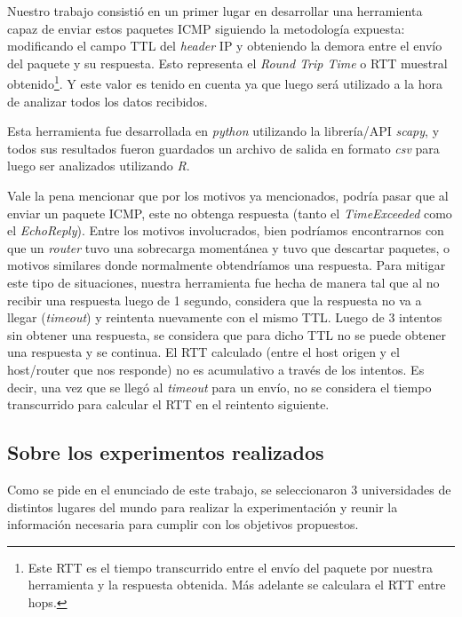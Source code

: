 \par Nuestro trabajo consisti\'o en un primer lugar en desarrollar una
herramienta capaz de enviar estos paquetes ICMP siguiendo la metodolog\'ia
expuesta: modificando el campo TTL del \textit{header} IP y obteniendo la demora
entre el env\'io del paquete y su respuesta. Esto representa el \textit{Round
Trip Time} o RTT muestral obtenido\footnote{Este RTT es el tiempo transcurrido
entre el env\'io del paquete por nuestra herramienta y la respuesta obtenida.
M\'as adelante se calculara el RTT entre hops.}. Y este valor es tenido en
cuenta ya que luego ser\'a utilizado a la hora de analizar todos los datos
recibidos.

\par Esta herramienta fue desarrollada en \textit{python}\cite{python}
utilizando la librer\'ia/API \textit{scapy}\cite{scapy}, y todos sus resultados
fueron guardados un archivo de salida en formato \textit{csv}\cite{csv} para
luego ser analizados utilizando \textit{R}\cite{R}.

\par Vale la pena mencionar que por los motivos ya mencionados, podr\'ia pasar
que al enviar un paquete ICMP, este no obtenga respuesta (tanto el \textit{%
TimeExceeded} como el \textit{EchoReply}). Entre los motivos involucrados, bien
podr\'iamos encontrarnos con que un \textit{router} tuvo una sobrecarga
moment\'anea y tuvo que descartar paquetes, o motivos similares donde
normalmente obtendr\'iamos una respuesta. Para mitigar este tipo de situaciones,
nuestra herramienta fue hecha de manera tal que al no recibir una respuesta
luego de 1 segundo, considera que la respuesta no va a llegar (\textit{timeout})
y reintenta nuevamente con el mismo TTL. Luego de 3 intentos sin obtener una
respuesta, se considera que para dicho TTL no se puede obtener una respuesta
y se continua. El RTT calculado (entre el host origen y el host/router que nos
responde) no es acumulativo a trav\'es de los intentos. Es decir, una vez que
se lleg\'o al \textit{timeout} para un env\'io, no se considera el tiempo
transcurrido para calcular el RTT en el reintento siguiente.


\subsection*{Sobre los experimentos realizados}
\par Como se pide en el enunciado de este trabajo, se seleccionaron 3
universidades de distintos lugares del mundo para realizar la experimentaci\'on
y reunir la informaci\'on necesaria para cumplir con los objetivos propuestos.

